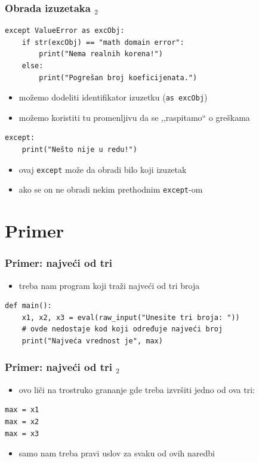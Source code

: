 \documentclass[utf8,compress]{beamer}
\begin{document}
\begin{frame}[fragile]
  \frametitle{Obrada izuzetaka $_2$}
\begin{verbatim}
except ValueError as excObj:
    if str(excObj) == "math domain error":
        print("Nema realnih korena!")
    else:
        print("Pogrešan broj koeficijenata.")
\end{verbatim}
  \begin{itemize}
    \item možemo dodeliti identifikator izuzetku (\texttt{as excObj})
    \item možemo koristiti tu promenljivu da se ,,raspitamo`` o greškama
  \end{itemize}
\begin{verbatim}
except:
    print("Nešto nije u redu!")
\end{verbatim}
  \begin{itemize}
    \item ovaj \texttt{except} može da obradi bilo koji izuzetak
    \item ako se on ne obradi nekim prethodnim \texttt{except}-om
  \end{itemize}
\end{frame}

\section{Primer}

\begin{frame}[fragile]
  \frametitle{Primer: najveći od tri}
  \begin{itemize}
    \item treba nam program koji traži najveći od tri broja
  \end{itemize}
\begin{verbatim}
def main():
    x1, x2, x3 = eval(raw_input("Unesite tri broja: "))
    # ovde nedostaje kod koji određuje najveći broj
    print("Najveća vrednost je", max)
\end{verbatim}
\end{frame}

\begin{frame}[fragile]
  \frametitle{Primer: najveći od tri $_2$}
  \begin{itemize}
    \item ovo liči na trostruko grananje gde treba izvršiti jedno od ova tri:
  \end{itemize}
\begin{verbatim}
max = x1
max = x2
max = x3
\end{verbatim}
  \begin{itemize}
    \item samo nam treba pravi uslov za svaku od ovih naredbi
  \end{itemize}
\end{frame}
\end{document}
